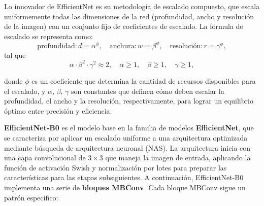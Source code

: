 Lo innovador de EfficientNet es su metodología de escalado compuesto, que escala uniformemente todas las dimensiones de la red (profundidad, ancho y resolución de la imagen) con un conjunto fijo de coeficientes de escalado. La fórmula de escalado se representa como:
\begin{equation}
	\text{profundidad}: d = \alpha^\phi, \quad \text{anchura}: w = \beta^\phi, \quad \text{resolución}: r = \gamma^\phi,
\end{equation}
tal que 
\[
\alpha \cdot \beta^2 \cdot \gamma^2 \approx 2, \quad \alpha \geq 1, \quad \beta \geq 1, \quad \gamma \geq 1,
\]

donde \(\phi\) es un coeficiente que determina la cantidad de recursos disponibles para el escalado, y \(\alpha\), \(\beta\), \(\gamma\) son constantes que definen cómo deben escalar la profundidad, el ancho y la resolución, respectivamente, para lograr un equilibrio óptimo entre precisión y eficiencia.

\textbf{EfficientNet-B0} es el modelo base en la familia de modelos \textbf{EfficientNet}, que se caracteriza por aplicar un escalado uniforme a una arquitectura optimizada mediante búsqueda de arquitectura neuronal (NAS). La arquitectura inicia con una capa convolucional de \(3 \times 3\) que maneja la imagen de entrada, aplicando la función de activación Swish y normalización por lotes para preparar las características para las etapas subsiguientes. A continuación, EfficientNet-B0 implementa una serie de \textbf{bloques MBConv}. Cada bloque MBConv sigue un patrón específico:

